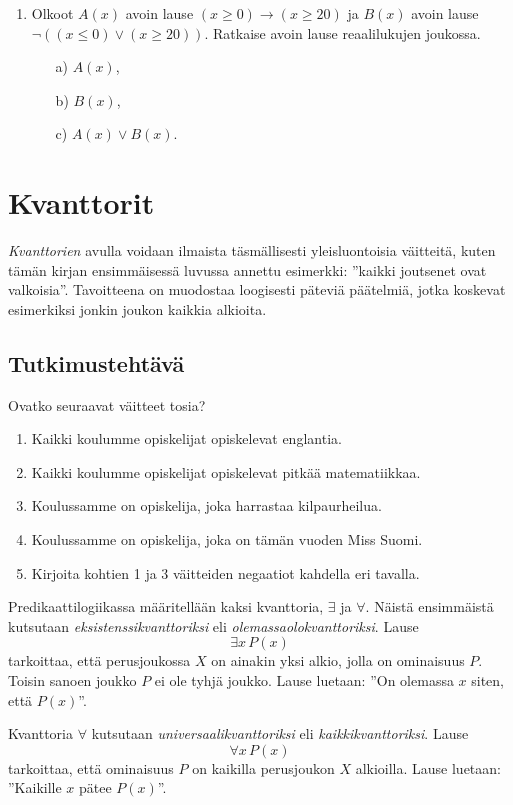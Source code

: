 \begin{enumerate}
\item
Olkoot $A(x)$ avoin lause $(x \ge 0) \to (x \ge 20)$
ja $B(x)$ avoin lause $\lnot ((x \le 0) \lor (x \ge 20))$. Ratkaise avoin lause reaalilukujen joukossa.
\begin{itemize}
\item[a)] $A(x)$,
\item[b)] $B(x)$,
\item[c)] $A(x) \lor B(x)$.
\end{itemize}

\end{enumerate}



\newpage

\section{Kvanttorit}
{\em Kvanttorien} avulla voidaan ilmaista täsmällisesti yleisluontoisia väitteitä, kuten tämän kirjan ensimmäisessä luvussa annettu esimerkki: ''kaikki joutsenet ovat valkoisia''. Tavoitteena on muodostaa loogisesti päteviä päätelmiä, jotka koskevat esimerkiksi jonkin joukon kaikkia alkioita.

\subsection*{Tutkimustehtävä}
Ovatko seuraavat väitteet tosia?
\begin{enumerate}
\item Kaikki koulumme opiskelijat opiskelevat englantia.
\item Kaikki koulumme opiskelijat opiskelevat pitkää matematiikkaa.
\item Koulussamme on opiskelija, joka harrastaa kilpaurheilua.
\item Koulussamme on opiskelija, joka on tämän vuoden Miss Suomi.
\item Kirjoita kohtien 1 ja 3 väitteiden negaatiot kahdella eri tavalla. 
\end{enumerate}

Predikaattilogiikassa määritellään kaksi kvanttoria, $\exists$ ja $\forall$. Näistä ensimmäistä kutsutaan {\em eksistenssikvanttoriksi} eli {\em olemassaolokvanttoriksi}. Lause
\[
\exists x\, P(x)
\]
tarkoittaa, että perusjoukossa $X$ on ainakin yksi alkio, jolla on ominaisuus $P$. Toisin sanoen joukko $P$ ei ole tyhjä joukko. Lause luetaan: ''On olemassa $x$ siten, että $P(x)$''.

Kvanttoria $\forall$ kutsutaan {\em universaalikvanttoriksi} eli {\em kaikkikvanttoriksi}. Lause
\[
\forall x\, P(x)
\]
tarkoittaa, että ominaisuus $P$ on kaikilla perusjoukon $X$ alkioilla. Lause luetaan: ''Kaikille $x$ pätee $P(x)$''.

